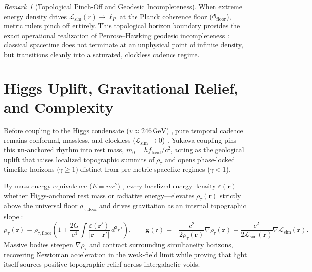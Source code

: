 \documentclass[11pt,a4paper]{article}
\theoremstyle{remark}
\newtheorem*{remark}{Remark}
\begin{document}
\begin{remark}[Topological Pinch-Off and Geodesic Incompleteness]
When extreme energy density drives $\mathcal{L}_{\mathrm{sim}}(r) \to \ell_P$ at the Planck coherence floor ($\Phi_{\mathrm{floor}}$), metric rulers pinch off entirely. This topological horizon boundary provides the exact operational realization of Penrose--Hawking geodesic incompleteness \cite{penrose1965,hawking1970}: classical spacetime does not terminate at an unphysical point of infinite density, but transitions cleanly into a saturated, clockless cadence regime.
\end{remark}

\section{Higgs Uplift, Gravitational Relief, and Complexity}

Before coupling to the Higgs condensate ($v \approx 246\,\mathrm{GeV}$) \cite{higgs1964,englert1964}, pure temporal cadence remains conformal, massless, and clockless ($\mathcal{L}_{\mathrm{sim}} \to 0$) \cite{penrose2010}. Yukawa coupling pins this un-anchored rhythm into rest mass, $m_0 = h f_{\mathrm{local}} / c^2$, acting as the geological uplift that raises localized topographic summits of $\rho_\tau$ and opens phase-locked timelike horizons ($\gamma \ge 1$) distinct from pre-metric spacelike regimes ($\gamma < 1$).

By mass-energy equivalence ($E = mc^2$) \cite{einstein1905}, every localized energy density $\varepsilon(\mathbf{r})$---whether Higgs-anchored rest mass or radiative energy---elevates $\rho_\tau(\mathbf{r})$ strictly above the universal floor $\rho_{\tau,\mathrm{floor}}$ and drives gravitation as an internal topographic slope \cite{einstein1916}:
\begin{equation}
\rho_\tau(\mathbf{r}) = \rho_{\tau,\mathrm{floor}} \left( 1 + \frac{2G}{c^4} \int \frac{\varepsilon(\mathbf{r}')}{|\mathbf{r} - \mathbf{r}'|} \, d^3 r' \right), \qquad \mathbf{g}(\mathbf{r}) = -\frac{c^2}{2\rho_\tau(\mathbf{r})} \nabla \rho_\tau(\mathbf{r}) = \frac{c^2}{2\mathcal{L}_{\mathrm{sim}}(\mathbf{r})} \nabla \mathcal{L}_{\mathrm{sim}}(\mathbf{r}).
\end{equation}
Massive bodies steepen $\nabla \rho_\tau$ and contract surrounding simultaneity horizons, recovering Newtonian acceleration in the weak-field limit while proving that light itself sources positive topographic relief across intergalactic voids.
\end{document}
